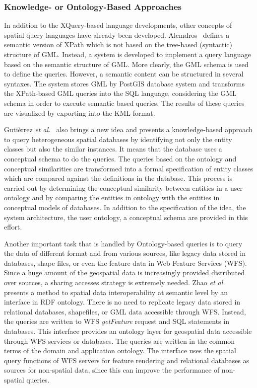 \documentclass[a4paper,12pt]{article}
\begin{document}
\subsubsection{Knowledge- or Ontology-Based Approaches}
\label{ontology}
In addition to the XQuery-based language developments, 
other concepts of spatial query languages have already been developed. 
Alemdros~\cite{Alemdros2011, Alemdros2013} defines a semantic version of XPath 
which is not based on the tree-based (syntactic) structure of GML. Instead, a system is developed to implement a query language based on the semantic structure of GML. More clearly, the GML schema is used to define the queries. However, a semantic content can be structured in several syntaxes. The system stores GML by PostGIS database system and transforms the XPath-based GML queries into the SQL language, considering the GML schema in order to execute semantic based queries. The results of these queries are visualized by exporting into the KML format.

Guti{\`e}rrez \emph{et al.}~\cite{Gutierrez2004} also brings a new idea and presents a knowledge-based approach 
to query heterogeneous spatial databases by identifying not only the entity classes but also the similar instances. 
It means that the database uses a conceptual schema to do the queries. 
The queries based on the ontology and conceptual similarities 
are transformed into a formal specification of entity classes 
which are compared against the definitions in the database. 
This process is carried out by determining the conceptual similarity between entities in a user ontology 
and by comparing the entities in ontology with the entities in conceptual models of databases. 
In addition to the specification of the idea, the system architecture, the user ontology, 
a conceptual schema are provided in this effort.

Another important task that is handled by Ontology-based queries is to query 
the data of different format and from various sources,
like legacy data stored in databases, shape files, 
or even the feature data in Web Feature Services (WFS).
Since a huge amount of the geospatial data is increasingly provided
distributed over sources,
a sharing accesses strategy is extremely needed.
Zhao \emph{et al.}~\cite{Zhao2008} presents a method to spatial data 
interoperability at semantic level by an interface in RDF ontology. 
There is no need to replicate legacy data stored in relational databases, shapefiles, or GML data accessible through WFS. Instead, the queries are written to WFS \textit{getFeature} request and SQL statements in databases. 
This interface provides an ontology layer for geospatial data accessible through WFS services or databases. 
The queries are written in the common terms of the domain and application ontology. 
The interface uses the spatial query functions of WFS servers for feature rendering and relational databases as sources for non-spatial data, since this can improve the performance of non-spatial queries. 
\end{document}
